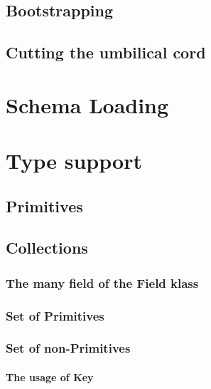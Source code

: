 \subsection{Bootstrapping}\label{sec:Bootstrapping}

\subsection{Cutting the umbilical cord}\label{subsec:Cutting the umbilical cord}

\section{Schema Loading}\label{sec:Schema Loading}

\section{Type support}\label{sec:Implementation Types}

\subsection{Primitives}\label{subsec:Types Primitives}

\subsection{Collections}\label{subsec:Types Collections}

\subsubsection{The many field of the Field klass}

\subsubsection{Set of Primitives}
\subsubsection{Set of non-Primitives}
\paragraph{The usage of Key}\label{The usage of Key}
